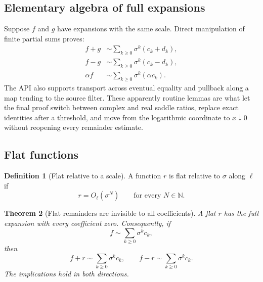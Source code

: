 \documentclass[11pt,oneside]{article}
\newtheorem{theorem}{Theorem}[section]
\theoremstyle{definition}
\newtheorem{definition}[theorem]{Definition}
\theoremstyle{remark}
\newcommand{\N}{\mathbb N}
\begin{document}
\subsection{Elementary algebra of full expansions}

Suppose $f$ and $g$ have expansions with the same scale.  Direct manipulation of finite
partial sums proves:
\begin{align}
 f+g&\sim\sum_{k\ge0}\sigma^k(c_k+d_k),                    \label{eq:expansion-add}\\
 f-g&\sim\sum_{k\ge0}\sigma^k(c_k-d_k),                    \label{eq:expansion-sub}\\
 \alpha f&\sim\sum_{k\ge0}\sigma^k(\alpha c_k).            \label{eq:expansion-smul}
\end{align}
The API also supports transport across eventual equality and pullback along a map tending to
the source filter.  These apparently routine lemmas are what let the final proof switch
between complex and real saddle ratios, replace exact identities after a threshold, and move
from the logarithmic coordinate to $x\downarrow0$ without reopening every remainder
estimate.

\subsection{Flat functions}

\begin{definition}[Flat relative to a scale]
\label{def:flat-scale}
A function $r$ is flat relative to $\sigma$ along $\ell$ if
\begin{equation}
 r=O_{\ell}(\sigma^N)
 \qquad\text{for every }N\in\N.
 \label{eq:flat-all-orders}
\end{equation}
\end{definition}

\begin{theorem}[Flat remainders are invisible to all coefficients]
\label{thm:flat-invisible}
A flat $r$ has the full expansion with every coefficient zero.  Consequently, if
\begin{equation}
 f\sim\sum_{k\ge0}\sigma^kc_k,
 \label{eq:f-exp-before-flat}
\end{equation}
then
\begin{equation}
 f+r\sim\sum_{k\ge0}\sigma^kc_k,
 \qquad
 f-r\sim\sum_{k\ge0}\sigma^kc_k.
 \label{eq:flat-preserves-expansion}
\end{equation}
The implications hold in both directions.
\end{theorem}
\end{document}
